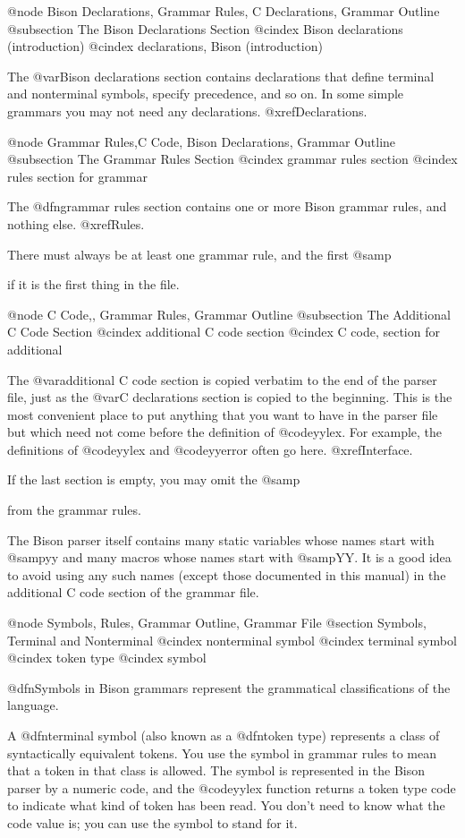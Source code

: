 {{{{{{{{{{{{{{{@node Bison Declarations, Grammar Rules, C Declarations, Grammar Outline
@subsection The Bison Declarations Section
@cindex Bison declarations (introduction)
@cindex declarations, Bison (introduction)

The @var{Bison declarations} section contains declarations that define
terminal and nonterminal symbols, specify precedence, and so on.
In some simple grammars you may not need any declarations.
@xref{Declarations}.

@node Grammar Rules,C Code, Bison Declarations, Grammar Outline
@subsection The Grammar Rules Section
@cindex grammar rules section
@cindex rules section for grammar

The @dfn{grammar rules} section contains one or more Bison grammar
rules, and nothing else.  @xref{Rules}.

There must always be at least one grammar rule, and the first
@samp{%
if it is the first thing in the file.

@node C Code,, Grammar Rules, Grammar Outline
@subsection The Additional C Code Section
@cindex additional C code section
@cindex C code, section for additional

The @var{additional C code} section is copied verbatim to the end of
the parser file, just as the @var{C declarations} section is copied to
the beginning.  This is the most convenient place to put anything
that you want to have in the parser file but which need not come before
the definition of @code{yylex}.  For example, the definitions of
@code{yylex} and @code{yyerror} often go here.  @xref{Interface}.

If the last section is empty, you may omit the @samp{%
from the grammar rules.

The Bison parser itself contains many static variables whose names start
with @samp{yy} and many macros whose names start with @samp{YY}.  It is a
good idea to avoid using any such names (except those documented in this
manual) in the additional C code section of the grammar file.

@node Symbols, Rules, Grammar Outline, Grammar File
@section Symbols, Terminal and Nonterminal
@cindex nonterminal symbol
@cindex terminal symbol
@cindex token type
@cindex symbol

@dfn{Symbols} in Bison grammars represent the grammatical classifications
of the language.

A @dfn{terminal symbol} (also known as a @dfn{token type}) represents a
class of syntactically equivalent tokens.  You use the symbol in grammar
rules to mean that a token in that class is allowed.  The symbol is
represented in the Bison parser by a numeric code, and the @code{yylex}
function returns a token type code to indicate what kind of token has been
read.  You don't need to know what the code value is; you can use the
symbol to stand for it.

}}}}}}}}}}}}}}}}}
